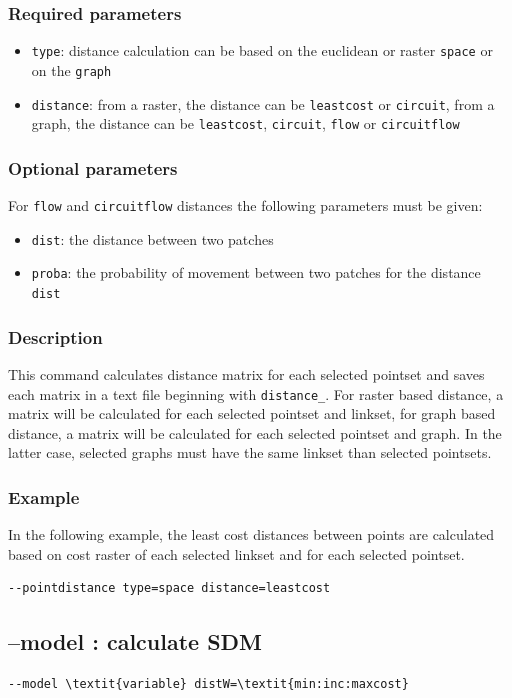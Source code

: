 \documentclass[a4paper,10pt]{report}
\begin{document}
\subsubsection{Required parameters}
\begin{itemize}
	\item \verb|type|: distance calculation can be based on the euclidean or raster \verb|space| or on the \verb|graph|
	\item \verb|distance|: from a raster, the distance can be \verb|leastcost| or \verb|circuit|, from a graph, the distance can be \verb|leastcost|, \verb|circuit|, \verb|flow| or \verb|circuitflow|
\end{itemize}

\subsubsection{Optional parameters}
For \verb|flow| and \verb|circuitflow| distances the following parameters must be given:
\begin{itemize}
	\item \verb|dist|: the distance between two patches
	\item \verb|proba|: the probability of movement between two patches for the distance \verb|dist|
\end{itemize}

\subsubsection{Description}
This command calculates distance matrix for each selected pointset and saves each matrix in a text file beginning with \verb|distance_|.
For raster based distance, a matrix will be calculated for each selected pointset and linkset, for graph based distance, a matrix will be calculated for each selected pointset and graph. In the latter case, selected graphs must have the same linkset than selected pointsets.

\subsubsection{Example}
In the following example, the least cost distances between points are calculated based on cost raster of each selected linkset and for each selected pointset.
\begin{Verbatim}
--pointdistance type=space distance=leastcost
\end{Verbatim}


\subsection{--model : calculate SDM}
\begin{Verbatim}[commandchars=\\\{\}]
--model \textit{variable} distW=\textit{min:inc:maxcost}
\end{Verbatim}
\end{document}
